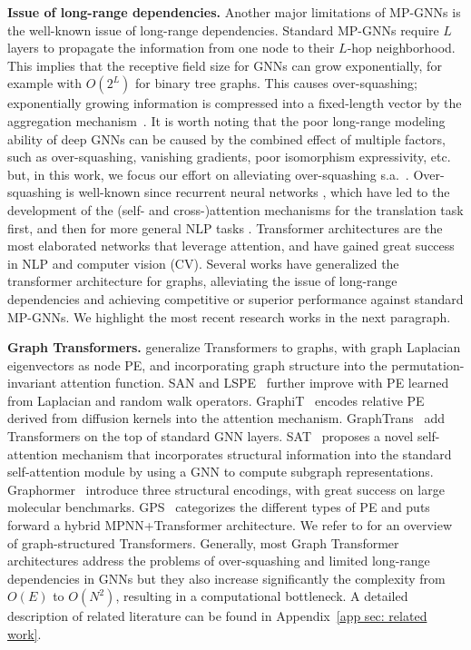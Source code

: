 \documentclass{article}
\begin{document}
{\bf Issue of long-range dependencies.}
Another major limitations of MP-GNNs is the well-known issue of long-range dependencies. Standard MP-GNNs require $L$ layers to propagate the information from one node to their $L$-hop neighborhood. This implies that the receptive field size for GNNs can grow exponentially, for example with $O(2^L)$ for binary tree graphs. This causes over-squashing; exponentially growing information  is compressed into a fixed-length vector 
by the aggregation mechanism~\citep{alon2020bottleneck, ToppingGC0B22}. 
It is worth noting that the poor long-range modeling ability of deep GNNs can be caused by the combined effect of multiple factors, such as over-squashing, vanishing gradients, poor isomorphism expressivity, etc. but, in this work, we focus our effort on alleviating over-squashing s.a.~\citet{deac2022expander,arnaiz2022diffwire}.
Over-squashing is well-known since recurrent neural networks \citep{hochreiter1997long}, which have led to the development of the (self- and cross-)attention mechanisms for the translation task \citep{bahdanau2014neural,vaswani2017attention} first, and then for more general NLP tasks \citep{devlin2018bert,brown2020language}. 
Transformer architectures are the most elaborated networks that leverage attention, and have gained great success in NLP and computer vision (CV).
Several works have generalized the transformer architecture for graphs, alleviating the issue of long-range dependencies and achieving competitive or superior performance against standard MP-GNNs. 
We highlight the most recent research works in the next paragraph.



\textbf{Graph Transformers.} \citet{dwivedi2021generalization} generalize Transformers to graphs, with graph Laplacian eigenvectors as node PE, and incorporating graph structure into the permutation-invariant attention function. SAN and LSPE~\citep{kreuzer2021rethinking,dwivedi2021graph} further improve with PE learned from Laplacian and random walk operators. GraphiT~\citep{mialon2021graphit} encodes relative PE derived from diffusion kernels into the attention mechanism. GraphTrans~\citep{wu2021GraphTrans} add Transformers on the top of standard GNN layers. SAT~\citep{chen2022structure_SAT} proposes a novel self-attention mechanism that incorporates structural information into the standard self-attention module by using a GNN to compute subgraph representations.
Graphormer~\citep{ying2021graphormer} introduce three structural encodings, with great success on large molecular benchmarks. GPS~\citep{rampavsek2022recipe} categorizes the different types of PE and puts forward a hybrid MPNN+Transformer architecture. We refer to \citet{min2022transformer} for an overview of graph-structured Transformers. Generally, most Graph Transformer architectures address the problems of over-squashing and limited long-range dependencies in GNNs but they also increase significantly the complexity from $O(E)$ to $O(N^2)$, resulting in a computational bottleneck. A detailed description of related literature can be found in Appendix~\ref{app sec: related work}.
\end{document}
